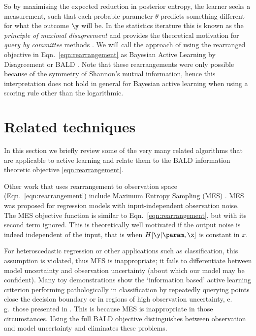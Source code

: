 So by maximising the expected reduction in posterior entropy, the learner seeks a measurement, such that each probable parameter $\theta$ predicts something different for what the outcome $\y$ will be. In the statistics iterature  this is known as the \emph{principle of maximal disagreement} and provides the theoretical motivation for \emph{query by committee} methods \citep{Freund1997}. We will call the approach of using the rearranged objective in Eqn.\ \eqref{eqn:rearrangement} as Bayesian Active Learning by Disagreement or BALD \citep{Houlsby2011,Houlsby2012preference,Huszar2012quantum}. Note that these rearrangements were only possible because of the symmetry of Shannon's mutual information, hence this interpretation does not hold in general for Bayesian active learning when using a scoring rule other than the logarithmic.

\section{Related techniques}

In this section we briefly review some of the very many related algorithms that are applicable to active learning and relate them to the BALD information theoretic objective \eqref{eqn:rearrangement}.

Other work that uses rearrangement to observation space (Eqn.\ \eqref{eqn:rearrangement}) include Maximum Entropy Sampling (MES) \citep{sebastiani2000}. MES was proposed for regression models with input-independent observation noise. The MES objective function is similar to Eqn.\ \eqref{eqn:rearrangement}, but with its second term ignored. This is theoretically well motivated if the output noise is indeed independent of the input, that is when $H[\y\vert\param,\x]$ is constant in $x$.

For heteroscedastic regression or other applications such as classification, this assumption is violated, thus MES is inappropriate; it fails to differentiate between model uncertainty and observation uncertainty (about which our model may be confident). Many toy demonstrations show the `information based' active learning criterion performing pathologically in classification by repeatedly querying points close the decision boundary or in regions of high observation uncertainty, e.\,g.\ those presented in \citep{dasgupta2008, huang2010}. This is because MES is inappropriate in those circumstances. Using the full BALD objective distinguishes between observation and model uncertainty and eliminates these problems.

